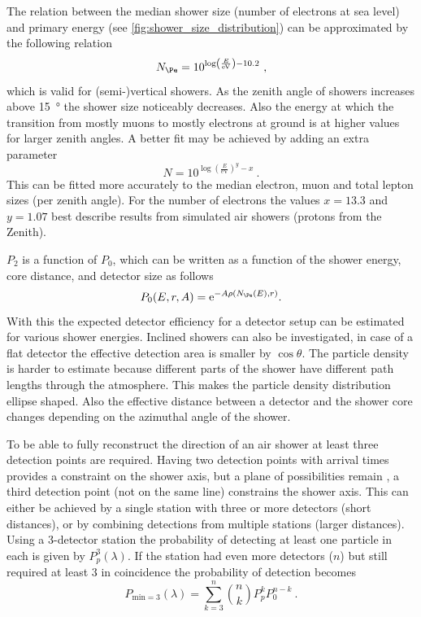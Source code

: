 The relation between the median shower size (number of electrons at sea level) and primary energy (see \cref{fig:shower_size_distribution}) can be approximated by the following relation
%
\begin{equation}
    N_{\Pe} = 10^{\log\left(\frac{E}{\si{\eV}}\right) - 10.2} \ ,
\end{equation}
%
which is valid for (semi-)vertical showers. As the zenith angle of showers increases above \SI{15}{\degree} the shower size noticeably decreases. Also the energy at which the transition from mostly muons to mostly electrons at ground is at higher values for larger zenith angles. A better fit may be achieved by adding an extra parameter
%
\begin{equation}
    N = 10^{\log\left(\frac{E}{\si{\eV}}\right)^y - x} \ .
\end{equation}
%
This can be fitted more accurately to the median electron, muon and total lepton sizes (per zenith angle). For the number of electrons the values $x = 13.3$ and $y = 1.07$ best describe results from simulated air showers (protons from the Zenith).

$P_2$ is a function of $P_0$, which can be written as a function of the shower energy, core distance, and detector size as follows
%
\begin{equation}
    P_0(E, r, A) = \mathrm{e}^{-A\rho(N_{\Pe}(E), r)} \\ .
\end{equation}
%
With this the expected detector efficiency for a detector setup can be estimated for various shower energies. Inclined showers can also be investigated, in case of a flat detector the effective detection area is smaller by $\cos \theta$. The particle density is harder to estimate because different parts of the shower have different path lengths through the atmosphere. This makes the particle density distribution ellipse shaped. Also the effective distance between a detector and the shower core changes depending on the azimuthal angle of the shower.

To be able to fully reconstruct the direction of an air shower at least three detection points are required. Having two detection points with arrival times provides a constraint on the shower axis, but a plane of possibilities remain \cite{schultheiss2016pair}, a third detection point (not on the same line) constrains the shower axis. This can either be achieved by a single station with three or more detectors (short distances), or by combining detections from multiple stations (larger distances). Using a 3-detector station the probability of detecting at least one particle in each is given by $P_p^3(\lambda)$. If the station had even more detectors ($n$) but still required at least 3 in coincidence the probability of detection becomes
%
\begin{equation}
    P_{\mathrm{min}=3}(\lambda) = \sum_{k=3}^{n} \binom{n}{k} P_p^k P_0^{n-k} \ .
\end{equation}

